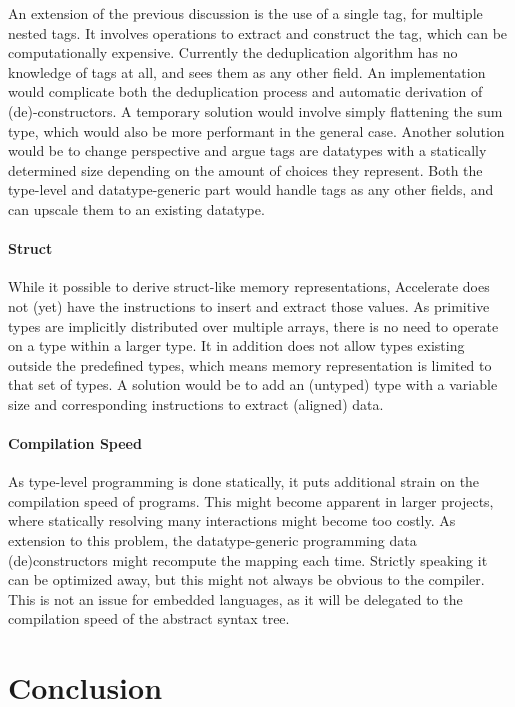 \documentclass{article}
\begin{document}
An extension of the previous discussion is the use of a single tag, for multiple nested tags.
It involves operations to extract and construct the tag, which can be computationally expensive.
Currently the deduplication algorithm has no knowledge of tags at all, and sees them as any other field.
An implementation would complicate both the deduplication process and automatic derivation of (de)-constructors.
A temporary solution would involve simply flattening the sum type, which would also be more performant in the general case.
Another solution would be to change perspective and argue tags are datatypes with a statically determined size depending on the amount of choices they represent.
Both the type-level and datatype-generic part would handle tags as any other fields, and can upscale them to an existing datatype.

\paragraph{Struct}

While it possible to derive struct-like memory representations, Accelerate does not (yet) have the instructions to insert and extract those values.
As primitive types are implicitly distributed over multiple arrays, there is no need to operate on a type within a larger type. 
It in addition does not allow types existing outside the predefined types, which means memory representation is limited to that set of types.
A solution would be to add an (untyped) type with a variable size and corresponding instructions to extract (aligned) data.

\paragraph{Compilation Speed}

As type-level programming is done statically, it puts additional strain on the compilation speed of programs.
This might become apparent in larger projects, where statically resolving many interactions might become too costly.
As extension to this problem, the datatype-generic programming data (de)constructors might recompute the mapping each time.
Strictly speaking it can be optimized away, but this might not always be obvious to the compiler. 
This is not an issue for embedded languages, as it will be delegated to the compilation speed of the abstract syntax tree. 

\newpage

\section{Conclusion}
\end{document}
